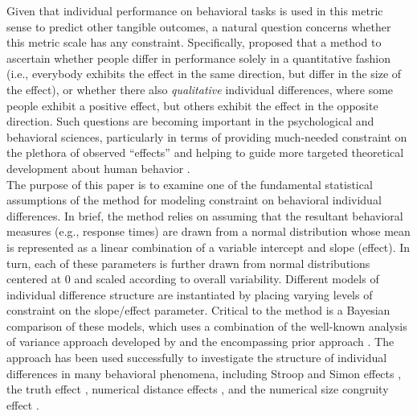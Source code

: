 \documentclass[12pt,twoside,a4paper]{article}
\begin{document}
Given that individual performance on behavioral tasks is used in this metric sense to predict other tangible outcomes, a natural question concerns whether this metric scale has any constraint. Specifically, \citet{haaf2017} proposed that a method to ascertain whether people differ in performance solely in a quantitative fashion (i.e., everybody exhibits the effect in the same direction, but differ in the size of the effect), or whether there also {\it qualitative} individual differences, where some people exhibit a positive effect, but others exhibit the effect in the opposite direction. Such questions are becoming important in the psychological and behavioral sciences, particularly in terms of providing much-needed constraint on the plethora of observed ``effects'' and helping to guide more targeted theoretical development about human behavior \citep{rouder2021}.  \\

The purpose of this paper is to examine one of the fundamental statistical assumptions of the \citet{haaf2017} method for modeling constraint on behavioral individual differences. In brief, the method relies on assuming that the resultant behavioral measures (e.g., response times) are drawn from a normal distribution whose mean is represented as a linear combination of a variable intercept and slope (effect). In turn, each of these parameters is further drawn from normal distributions centered at 0 and scaled according to overall variability. Different models of individual difference structure are instantiated by placing varying levels of constraint on the slope/effect parameter. Critical to the \citet{haaf2017}  method is a Bayesian comparison of these models, which uses a combination of the well-known analysis of variance approach developed by \citet{rouder2012} and the encompassing prior approach \citep{faulkenberry2019encompassing}. The approach has been used successfully to investigate the structure of individual differences in many behavioral phenomena, including Stroop and Simon effects \citep{haaf2018}, the truth effect \citep{schnuerch2020}, numerical distance effects \citep{vogel2021}, and the numerical size congruity effect \citep{faulkenberryBowman2020}.\\
\end{document}
